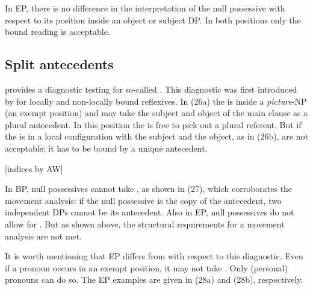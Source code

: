 \documentclass[output=paper]{langsci/langscibook}
\begin{document}
In EP, there is no difference in the interpretation of the null possessive with respect to its position inside an object or subject DP. In both positions only the bound reading is acceptable.

\subsection{Split antecedents}%

\citet{Rodrigues2010} provides a diagnostic testing for so-called . This diagnostic was first introduced by \citet{Lebeaux1985} for locally and non-locally bound reflexives. In (26a) the  is inside a \textit{picture}{}-NP (an exempt position) and may take the subject and object of the main clause as a plural antecedent. In this position the  is free to pick out a plural referent. But if the  is in a local configuration with the subject and the object, as in (26b),  are not acceptable; it has to be bound by a unique antecedent.

\ea%
    \citep[346]{Lebeaux1985} [indices by AW]  \label{ex:wein:26}\\
    \z
\z

In BP, null possessives cannot take , as shown in (27), which corroborates the movement analysis: if the null possessive is the copy of the antecedent, two independent DPs cannot be its antecedent. Also in EP, null possessives do not allow for . But as shown above, the structural requirements for a movement analysis are not met.

    \z

It is worth mentioning that EP differs from  with respect to this diagnostic. Even if a  pronoun occurs in an exempt position, it may not take . Only (personal) pronouns can do so. The EP examples are given in (28a) and (28b), respectively.
\end{document}
